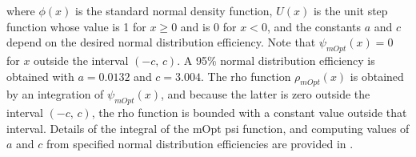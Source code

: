 \documentclass[graybox,envcountchap,sectrefs]{svmono}\usepackage[]{graphicx}\usepackage[]{xcolor}
\begin{document}
\begin{appendices}
where $\phi(x)$ is the standard normal density function, $\mathrm{\mathit{U}}(x)$
is the unit step function whose value is 1 for $x\geqslant0$ and
is 0 for $x<0$, and the constants $a$ and $c$ depend on the desired
normal distribution efficiency. Note that $\psi_{mOpt}(x)=0$ for
$x$ outside the interval $(-c,\,c)$. A 95\% normal distribution
efficiency is obtained with $a=0.0132$ and $c=3.004$. The rho function
$\rho_{mOpt}(x)$ is obtained by an integration of $\psi_{mOpt}(x)$,
and because the latter is zero outside the interval $(-c,\,c)$, the
rho function is bounded with a constant value outside that interval.
Details of the integral of the mOpt psi function, and computing values
of $a$ and $c$ from specified normal distribution efficiencies are
provided in \citet{KonisMartin2021}.

\end{appendices}

\pagebreak{}

\begin{flushleft}
\printbibliography
\par\end{flushleft}

\newpage
\end{document}
